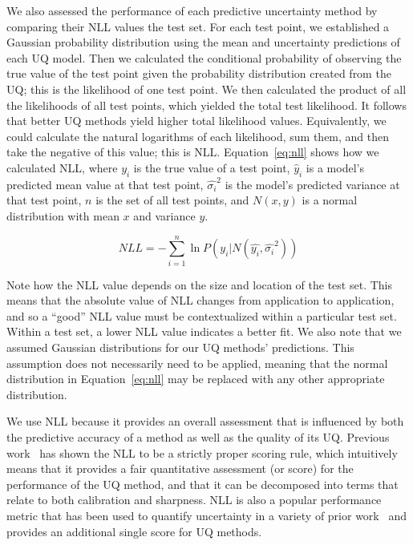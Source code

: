 \documentclass[]{achemso}
\begin{document}
We also assessed the performance of each predictive uncertainty method by comparing their \gls{NLL} values the test set.
For each test point, we established a Gaussian probability distribution using the mean and uncertainty predictions of each \gls{UQ} model.
Then we calculated the conditional probability of observing the true value of the test point given the probability distribution created from the \gls{UQ}; this is the likelihood of one test point.
We then calculated the product of all the likelihoods of all test points, which yielded the total test likelihood.
It follows that better \gls{UQ} methods yield higher total likelihood values.
Equivalently, we could calculate the natural logarithms of each likelihood, sum them, and then take the negative of this value; this is \gls{NLL}.
Equation~\ref{eq:nll} shows how we calculated \gls{NLL}, where $y_i$ is the true value of a test point, $\hat{y}_i$ is a model's predicted mean value at that test point, $\hat{\sigma_i}^2$ is the model's predicted variance at that test point, $n$ is the set of all test points, and $N(x, y)$ is a normal distribution with mean $x$ and variance $y$.

\begin{equation}\label{eq:nll}
    NLL = - \sum_{i=1}^{n} \ln{P(y_i | N(\hat{y_i}, \hat{\sigma_i}^2))}
\end{equation}

\noindent Note how the \gls{NLL} value depends on the size and location of the test set.
This means that the absolute value of \gls{NLL} changes from application to application, and so a ``good'' \gls{NLL} value must be contextualized within a particular test set.
Within a test set, a lower \gls{NLL} value indicates a better fit.
We also note that we assumed Gaussian distributions for our \gls{UQ} methods' predictions.
This assumption does not necessarily need to be applied, meaning that the normal distribution in Equation~\ref{eq:nll} may be replaced with any other appropriate distribution.

We use \gls{NLL} because it provides an overall assessment that is influenced by both the predictive accuracy of a method as well as the quality of its \gls{UQ}.
Previous work~\cite{Gneiting2007, Dawid2014} has shown the \gls{NLL} to be a strictly proper scoring rule, which intuitively means that it provides a fair quantitative assessment (or score) for the performance of the \gls{UQ} method, and that it can be decomposed into terms that relate to both calibration and sharpness.
\gls{NLL} is also a popular performance metric that has been used to quantify uncertainty in a variety of prior work~\cite{Lakshminarayanan2017} and provides an additional single score for \gls{UQ} methods.
\end{document}
